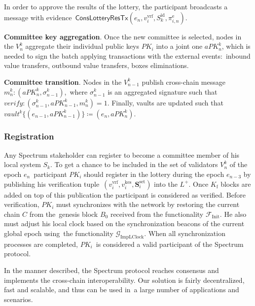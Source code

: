 \begin{legal}
\begin{itemize}
        \bigskip
        In order to approve the results of the lottery, the participant broadcasts a message with evidence\
        $\textsf{ConsLotteryResTx}(e_n, v_i^{\text{vrf}}, S_k^{\text{id}}, \pi_{i, n}^{\text{e}})$.

    \end{itemize}

    \item \textbf{Committee key aggregation}.
    Once the new committee is selected, nodes in the $V^k_n$ aggregate their individual public keys $PK_i$ into
    a joint one $aPK^k_n$, which is needed to sign the batch applying transactions with the external events:\
    inbound value transfers, outbound value transfers, boxes eliminations.

    \item \textbf{Committee transition}.
    Nodes in the $V^k_{n - 1}$ publish cross-chain message ${m^k_n : (aPK^k_n, \sigma^k_{n-1})}$,\
    where $\sigma^k_{n-1}$ is an aggregated signature such that ${verify: (\sigma^k_{n-1}, aPK^k_{n-1}, m^k_n) = 1}$.
    Finally, vaults are updated such that ${vault^k\{(e_{n-1}, aPK^k_{n-1})\} \coloneqq(e_n, aPK^k_n)}$.
\end{legal}

\subsubsection{Registration}\label{subsubsec:registration}
Any Spectrum stakeholder can register to become a committee member of his local system $S_k$.
To get a chance to be included in the set of validators $V^k_n$ of the epoch $e_n$\
participant $PK_i$ should register in the lottery during the epoch $e_{n-3}$ by publishing his verification tuple\
$(v_i^{\text{vrf}}, v_i^{\text{kes}}, \mathbf{S}_i^{\text{set}})$ into the $L^+$.
Once $K_{\text{f}}$ blocks are added on top of this publication the participant is considered as verified.
Before verification, $PK_i$ must synchronizes with the network by restoring the current chain $C$ from the\
genesis block $B_0$ received from the functionality $\mathcal{F}_{\text{Init}}$.
He also must adjust his local clock based on the synchronization beacons of the current global epoch using\
the functionality $\mathcal{G}_{\text{ImpLClock}}$.
When all synchronization processes are completed, $PK_i$\
is considered a valid participant of the Spectrum protocol.

In the manner described, the Spectrum protocol reaches consensus and implements the cross-chain interoperability.
Our solution is fairly decentralized, fast and scalable, and thus can be used in\
a large number of applications and scenarios.